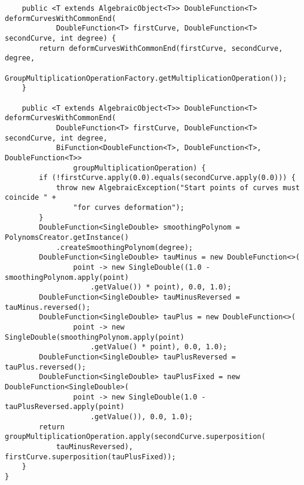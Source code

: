\begin{verbatim}
    public <T extends AlgebraicObject<T>> DoubleFunction<T> deformCurvesWithCommonEnd(
            DoubleFunction<T> firstCurve, DoubleFunction<T> secondCurve, int degree) {
        return deformCurvesWithCommonEnd(firstCurve, secondCurve, degree,
                GroupMultiplicationOperationFactory.getMultiplicationOperation());
    }

    public <T extends AlgebraicObject<T>> DoubleFunction<T> deformCurvesWithCommonEnd(
            DoubleFunction<T> firstCurve, DoubleFunction<T> secondCurve, int degree,
            BiFunction<DoubleFunction<T>, DoubleFunction<T>, DoubleFunction<T>>
                groupMultiplicationOperation) {
        if (!firstCurve.apply(0.0).equals(secondCurve.apply(0.0))) {
            throw new AlgebraicException("Start points of curves must coincide " +
                "for curves deformation");
        }
        DoubleFunction<SingleDouble> smoothingPolynom = PolynomsCreator.getInstance()
            .createSmoothingPolynom(degree);
        DoubleFunction<SingleDouble> tauMinus = new DoubleFunction<>(
                point -> new SingleDouble((1.0 - smoothingPolynom.apply(point)
                    .getValue()) * point), 0.0, 1.0);
        DoubleFunction<SingleDouble> tauMinusReversed = tauMinus.reversed();
        DoubleFunction<SingleDouble> tauPlus = new DoubleFunction<>(
                point -> new SingleDouble(smoothingPolynom.apply(point)
                    .getValue() * point), 0.0, 1.0);
        DoubleFunction<SingleDouble> tauPlusReversed = tauPlus.reversed();
        DoubleFunction<SingleDouble> tauPlusFixed = new DoubleFunction<SingleDouble>(
                point -> new SingleDouble(1.0 - tauPlusReversed.apply(point)
                    .getValue()), 0.0, 1.0);
        return groupMultiplicationOperation.apply(secondCurve.superposition(
            tauMinusReversed), firstCurve.superposition(tauPlusFixed));
    }
}
\end{verbatim}

